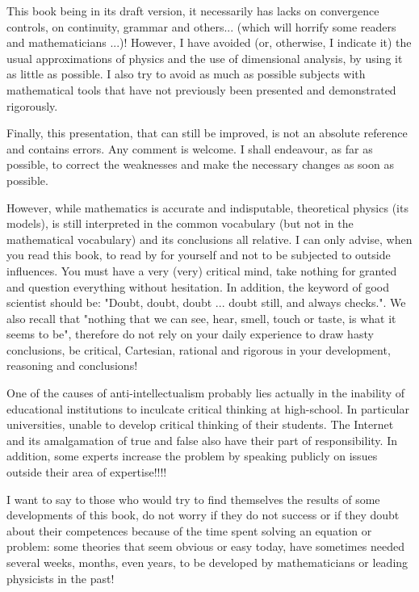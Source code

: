 	This book being in its draft version, it necessarily has lacks on convergence controls, on continuity, grammar and others... (which will horrify some readers and mathematicians ...)! However, I have avoided (or, otherwise, I indicate it) the usual approximations of physics and the use of dimensional analysis, by using it as little as possible. I also try to avoid as much as possible subjects with mathematical tools that have not previously been presented and demonstrated rigorously.
	
	Finally, this presentation, that can still be improved, is not an absolute reference and contains errors. Any comment is welcome. I shall endeavour, as far as possible, to correct the weaknesses and make the necessary changes as soon as possible.
	
	However, while mathematics is accurate and indisputable, theoretical physics (its models), is still interpreted in the common vocabulary (but not in the mathematical vocabulary) and its conclusions all relative. I can only advise, when you read this book, to read by for yourself and not to be subjected to outside influences. You must have a very (very) critical mind, take nothing for granted and question everything without hesitation. In addition, the keyword of good scientist should be: "Doubt, doubt, doubt ... doubt still, and always checks.". We also recall that "nothing that we can see, hear, smell, touch or taste, is what it seems to be", therefore do not rely on your daily experience to draw hasty conclusions, be critical, Cartesian, rational and rigorous in your development, reasoning and conclusions!
	\begin{tcolorbox}[title=Remark,arc=10pt,breakable,drop lifted shadow,
  skin=enhanced,
  skin first is subskin of={enhancedfirst}{arc=10pt,no shadow},
  skin middle is subskin of={enhancedmiddle}{arc=10pt,no shadow},
  skin last is subskin of={enhancedlast}{drop lifted shadow}]
	One of the causes of anti-intellectualism probably lies actually in the inability of educational institutions to inculcate critical thinking at high-school. In particular universities, unable to develop critical thinking of their students. The Internet and its amalgamation of true and false also have their part of responsibility. In addition, some experts increase the problem by speaking publicly on issues outside their area of expertise!!!!
	\end{tcolorbox}
	I want to say to those who would try to find themselves the results of some developments of this book, do not worry if they do not success or if they doubt about their competences because of the time spent solving an equation or problem: some theories that seem obvious or easy today, have sometimes needed several weeks, months, even years, to be developed by mathematicians or leading physicists in the past!
	
